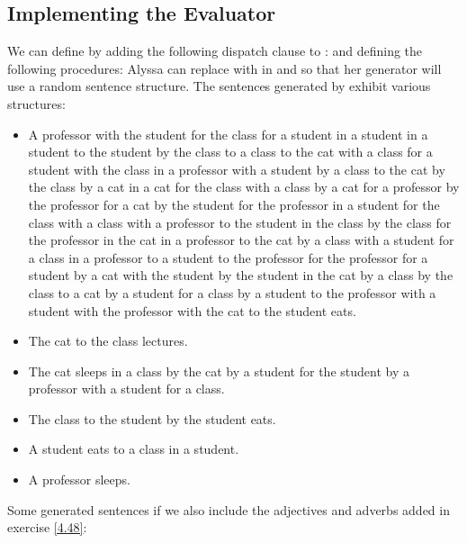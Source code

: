 \subsection{Implementing the  Evaluator}

\begin{exe}[4.50]
    We can define  by adding the following dispatch clause to 
    :
    and defining the following procedures:
    Alyssa can replace  with  in  
    and  so that her generator will use a random 
    sentence structure. The sentences generated by  exhibit 
    various structures:
    \begin{itemize}
        \item A professor with the student for the class for a student in 
            a student in a student to the student by the class to a class to the 
            cat with a class for a student with the class in a professor with 
            a student by a class to the cat by the class by a cat in a cat for 
            the class with a class by a cat for a professor by the professor for 
            a cat by the student for the professor in a student for the class 
            with a class with a professor to the student in the class by the 
            class for the professor in the cat in a professor to the cat by 
            a class with a student for a class in a professor to a student to 
            the professor for the professor for a student by a cat with the 
            student by the student in the cat by a class by the class to a cat 
            by a student for a class by a student to the professor with 
            a student with the professor with the cat to the student eats.
        \item The cat to the class lectures.
        \item The cat sleeps in a class by the cat by a student for the student 
            by a professor with a student for a class.
        \item The class to the student by the student eats.
        \item A student eats to a class in a student.
        \item A professor sleeps.
    \end{itemize}
    Some generated sentences if we also include the adjectives and adverbs added 
    in exercise \ref{4.48}:
    \begin{itemize}

\end{itemize}
\end{exe}
